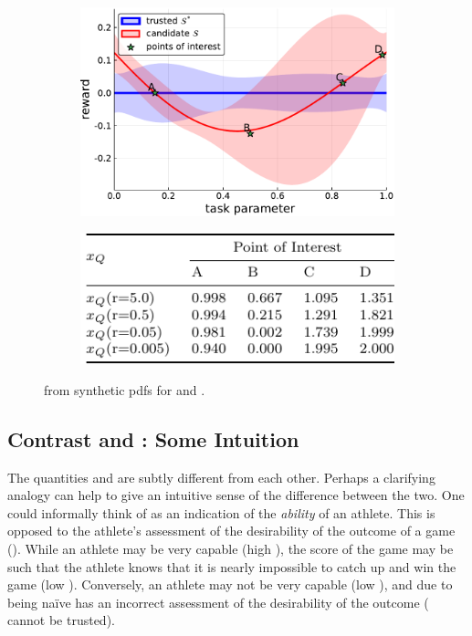 \begin{figure}[tbp]
    \centering
    \begin{subfigure}[c]{0.5\linewidth}
        \centering
        \includegraphics[width=0.99\linewidth]{Figures/p1.pdf}
        \vfill
    \end{subfigure}%
    \hfill
    \begin{subfigure}[t]{0.5\linewidth}
        \centering
        \includegraphics[width=0.95\linewidth]{Figures/p1_table.pdf}
    \end{subfigure} 
    \caption{\xQ{} from synthetic \pri{} pdfs for \solvetrust{} and \solvecand{}.}
    \label{fig:sq_thry1}
\end{figure}

\subsection{Contrast \xQ{} and \xO{}: Some Intuition}
The quantities \xQ{} and \xO{} are subtly different from each other. Perhaps a clarifying analogy can help to give an intuitive sense of the difference between the two. One could informally think of \xQ{} as an indication of the \emph{ability} of an athlete. This is opposed to the athlete's assessment of the desirability of the outcome of a game (\xO). While an athlete may be very capable (high \xQ), the score of the game may be such that the athlete knows that it is nearly impossible to catch up and win the game (low \xO). Conversely, an athlete may not be very capable (low \xQ), and due to being na\"{i}ve has an incorrect assessment of the desirability of the outcome (\xO{} cannot be trusted).
